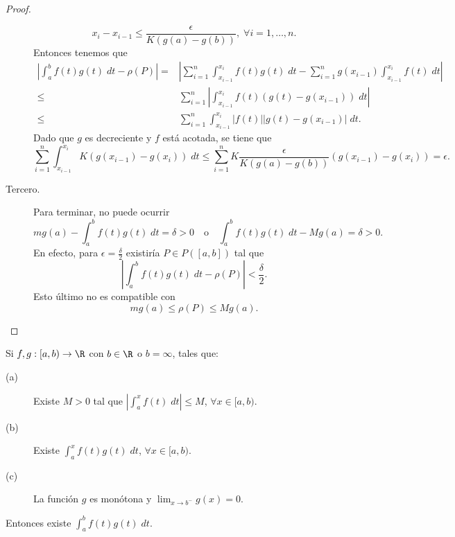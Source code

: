 \begin{proof}
\begin{description}
	\[x_{i}-x_{i-1} \leq \frac{\epsilon }{K\left(g\left(a\right)-g\left(b\right)\right)}, \; \forall i = 1, \ldots, n .\]
	Entonces tenemos que 
	\[
	\begin{split}
		\left|\int^{b}_{a} f\left(t\right)g\left(t\right) \; dt - \rho\left(P\right)\right| = & \left|\sum^{n}_{i=1}\int^{x_{i}}_{x_{i-1}} f\left(t\right)g\left(t\right) \; dt - \sum^{n}_{i=1}g\left(x_{i-1}\right)\int^{x_{i}}_{x_{i-1}} f\left(t\right) \; dt\right| \\
		\leq & \sum^{n}_{i=1} \left|\int^{x_{i}}_{x_{i-1}} f\left(t\right)\left(g\left(t\right)-g\left(x_{i-1}\right)\right) \; dt\right|  \\
		\leq & \sum^{n}_{i=1}\int^{x_{i}}_{x_{i-1}} \left|f\left(t\right)\right| \left|g\left(t\right)-g\left(x_{i-1}\right)\right| \; dt.
	\end{split}
	\]
	Dado que $\displaystyle g $ es decreciente y $\displaystyle f $ está acotada, se tiene que 
	\[ \sum^{n}_{i=1}\int^{x_{i}}_{x_{i-1}} K\left(g\left(x_{i-1}\right)-g\left(x_{i}\right)\right) \; dt \leq \sum^{n}_{i=1} K \frac{\epsilon }{K\left(g\left(a\right)-g\left(b\right)\right)}\left(g\left(x_{i-1}\right)-g\left(x_{i}\right)\right) = \epsilon .\]
\item[Tercero.]	Para terminar, no puede ocurrir
	\[mg\left(a\right) - \int^{b}_{a} f\left(t\right)g\left(t\right) \; dt = \delta > 0 \quad \text{o} \quad \int^{b}_{a} f\left(t\right)g\left(t\right) \; dt - Mg\left(a\right) = \delta > 0 .\]
	En efecto, para $\displaystyle \epsilon = \frac{\delta }{2} $ existiría $\displaystyle P \in P\left([a,b]\right) $ tal que 
	\[ \left|\int^{b}_{a} f\left(t\right)g\left(t\right) \; dt - \rho\left(P\right)\right| < \frac{\delta }{2} .\]
	Esto último no es compatible con 
	\[ mg\left(a\right) \leq \rho\left(P\right) \leq Mg\left(a\right) .\]
\end{description}
\end{proof}
\begin{ftheorem}
\normalfont Si $\displaystyle f,g : [a,b) \to \R $ con $\displaystyle b \in \R $ o $\displaystyle b = \infty $, tales que:
\begin{description}
\item[(a)] Existe $\displaystyle M > 0 $ tal que $\displaystyle \left|\int^{x}_{a} f\left(t\right) \; dt\right| \leq M $, $\displaystyle \forall x \in [a,b) $.
\item[(b)] Existe $\displaystyle \int^{x}_{a} f\left(t\right)g\left(t\right) \; dt $, $\displaystyle \forall x \in [a,b) $.
\item[(c)] La función $\displaystyle g $ es monótona y $\displaystyle \lim_{x \to b^{-}}g\left(x\right) = 0 $.
\end{description}
Entonces existe $\displaystyle \int^{b}_{a} f\left(t\right)g\left(t\right) \; dt $.
\end{ftheorem}
